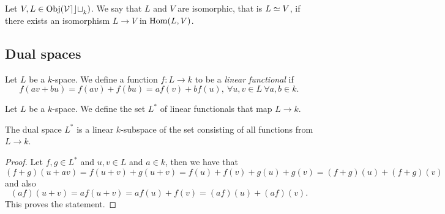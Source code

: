 \begin{definition}[Isomorphism]
   Let \(V, L \in \operatorname{Obj}(\mathcal{Vect}_k)\). We say that \(L\) and \(V\) are
   isomorphic, that is \(L \simeq V\), if there exists an isomorphism \(L \to V\)
   in \(\operatorname{Hom}(L, V)\).
\end{definition}

\subsection{Dual spaces}

\begin{definition}\label{def: linear functional}
   Let \(L\) be a \(k\)-space. We define a function \(f : L \to k\) to be a
   \emph{linear functional} if 
   \[
      f(av + bu) = f(av) + f(bu) = af(v) + bf(u),\ \forall u, v \in L\ \forall
      a, b \in k.
   \] 
\end{definition}

\begin{definition}\label{def: dual space}
   Let \(L\) be a \(k\)-space. We define the set \(L^\ast\) of linear
   functionals that map \(L \to k\).
\end{definition}

\begin{proposition}
   The dual space \(L^\ast\) is a linear \(k\)-subspace of the set consisting of
   all functions from \(L \to k\).
\end{proposition}

\begin{proof}
   Let \(f, g \in L^\ast\) and \(u, v \in L\) and \(a \in k\), then we have that
   \[(f + g)(u + av) = f(u+v) + g(u+v) = f(u) + f(v) + g(u) + g(v) = (f + g)(u)
   + (f + g)(v)\] and also \[(af)(u + v) = af(u + v) = af(u) + f(v) = (af)(u) +
   (af)(v).\] This proves the statement.
\end{proof}
